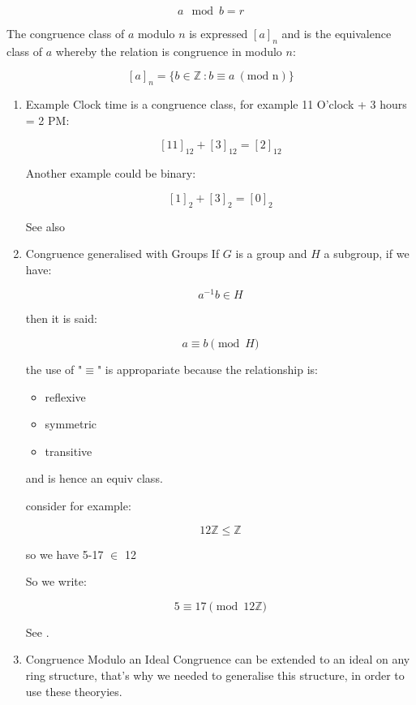 \documentclass[a4paper,11pt,twoside]{article}
\begin{document}
\[
      a \mod b = r
      \]


The congruence class of \(a\) modulo \(n\) is expressed
\(\left[a\right]_n\) and is the equivalence class of \(a\) whereby
the relation is congruence in modulo \(n\):

\[\left\lbrack a \right\rbrack_{n} = \{ b\mathbb{\in Z\ :}b \equiv a\ \left( \text{mod\ n} \right)\}\]   


\begin{enumerate}
\item Example
\label{sec:orgdc9e9c0}
Clock time is a congruence class, for example 11 O'clock + 3 hours
= 2 PM:

\[
       \left[11\right]_{12}+\left[3\right]_{12}=\left[2\right]_{12}
       \]

Another example could be binary:


\[
       \left[1\right]_{2}+\left[3\right]_{2}=\left[0\right]_{2}
       \]


See also \cite[\S 4c]{roberthowlettUndergraduateCourseAbstract}

\item Congruence generalised with Groups
\label{sec:orgc590dfa}
If \(G\) is a group and \(H\) a subgroup, if we have:

\[
       a^{-1}b \in H
       \]

then it is said:

\[
       a \equiv b \pmod{H}
       \]

the use of "\(\equiv\)" is appropariate because the relationship
is:

\begin{itemize}
\item reflexive
\item symmetric
\item transitive
\end{itemize}

and is hence an equiv class.

consider for example:

\[
       12 \mathbb{Z} \leqslant \mathbb{Z}
       \]

so we have 5-17 \(\in\) 12 

So we write:

\[
       5 \equiv 17 \pmod{12\mathbb{Z}}
       \]

See \cite[\S 3.7]{gregoryleeAbstractAlgebra2018}.

\item Congruence Modulo an Ideal
\label{sec:orgaac9793}
Congruence can be extended to an ideal on any ring structure,
that's why we needed to generalise this structure, in order to use
these theoryies.


\end{enumerate}
\end{document}
